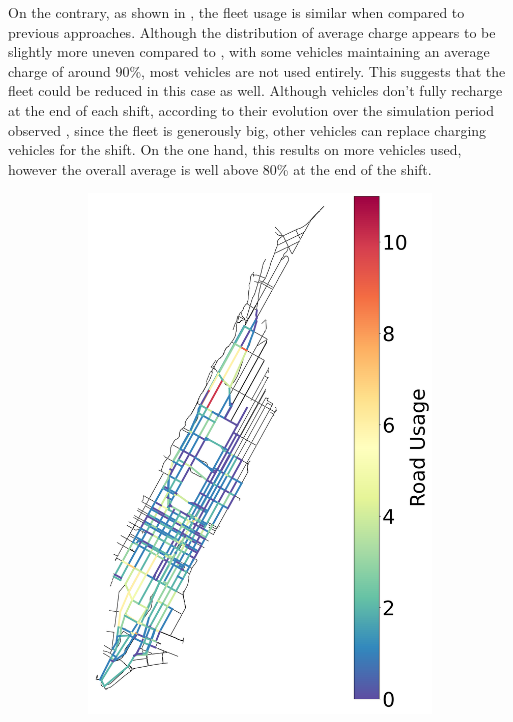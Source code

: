  On the contrary, as shown in , the fleet usage is similar when compared to previous approaches. Although the distribution of average charge appears to be slightly more uneven compared to  , with some vehicles maintaining an average charge of around 90\%, most vehicles are not used entirely. This suggests that the fleet could be reduced in this case as well. Although vehicles don't fully recharge at the end of each shift, according to their evolution over the simulation period observed , since the fleet is generously big, other vehicles can replace charging vehicles for the shift. On the one hand, this results on more vehicles used, however the overall average is well above 80\% at the end of the shift.  

\begin{figure}[th]
	\centering
	\begin{subfigure}[b]{0.35\textwidth}
		\centering
		\includegraphics[width=\textwidth]{assets/img/07_graph_based/nyc_road_usage_charging.png}

\end{subfigure}
\end{figure}
